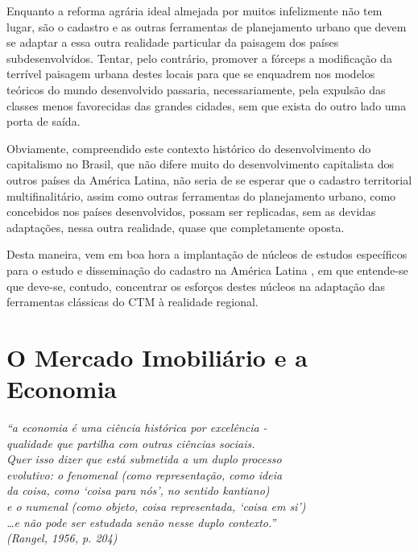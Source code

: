 \documentclass[
	12pt,				%
	oneside,			%
	a4paper,			%
	chapter=TITLE,		%
	section=TITLE,		%
	english,			%
	brazil				%
	]{abntex2}
\begin{document}
Enquanto a reforma agrária ideal almejada por muitos infelizmente não
tem lugar, são o cadastro e as outras ferramentas de planejamento urbano
que devem se adaptar a essa outra realidade particular da paisagem dos
países subdesenvolvidos. Tentar, pelo contrário, promover a fórceps a
modificação da terrível paisagem urbana destes locais para que se
enquadrem nos modelos teóricos do mundo desenvolvido passaria,
necessariamente, pela expulsão das classes menos favorecidas das grandes
cidades, sem que exista do outro lado uma porta de saída.

Obviamente, compreendido este contexto histórico do desenvolvimento do
capitalismo no Brasil, que não difere muito do desenvolvimento
capitalista dos outros países da América Latina, não seria de se esperar
que o cadastro territorial multifinalitário, assim como outras
ferramentas do planejamento urbano, como concebidos nos países
desenvolvidos, possam ser replicadas, sem as devidas adaptações, nessa
outra realidade, quase que completamente oposta.

Desta maneira, vem em boa hora a implantação de núcleos de estudos
específicos para o estudo e disseminação do cadastro na América Latina
\autocite{lalan}, em que entende-se que deve-se, contudo, concentrar os
esforços destes núcleos na adaptação das ferramentas clássicas do CTM à
realidade regional.

\hypertarget{economia}{\chapter{O Mercado Imobiliário e a
Economia}\label{economia}}
\begin{epigrafe}
    \vspace*{\fill}
    \begin{flushright}
    \textit{``a economia é uma ciência histórica por excelência -\\
    qualidade que partilha com outras ciências sociais.\\
    Quer isso dizer que está submetida a um duplo processo\\
    evolutivo: o fenomenal (como representação, como ideia \\
    da coisa, como `coisa para nós', no sentido kantiano)\\
    e o numenal (como objeto, coisa representada, `coisa em si')\\
    \ldots e não pode ser estudada senão nesse duplo contexto.''\\
    (Rangel, 1956, p. 204)}
    \end{flushright}
\end{epigrafe}
\end{document}
